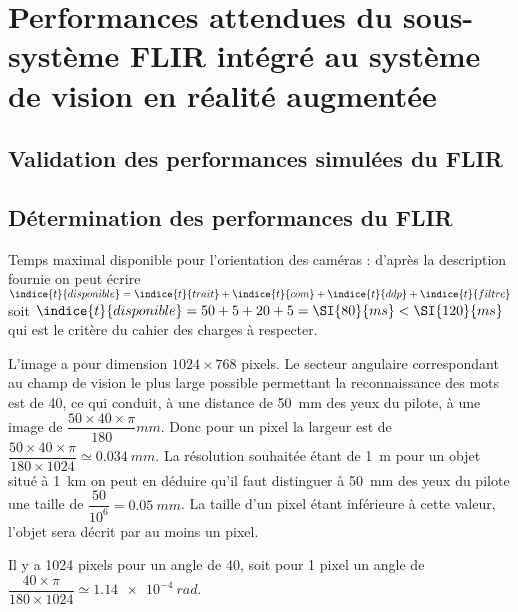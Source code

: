 
\section{Performances attendues du sous-système FLIR intégré au système
de vision en réalité augmentée}
\subsection{Validation des performances simulées du FLIR}
\subsection{Détermination des performances du FLIR}


\question{}
\ifprof
\begin{corrige}
Temps maximal disponible pour l'orientation des caméras : d'après la description fournie on peut écrire
$\indice{t}{disponible} = \indice{t}{trait}+ \indice{t}{com}+ \indice{t}{ddp}+ \indice{t}{filtre}$
 soit $\indice{t}{disponible} = 50+5+20+5=\SI{80}{ms}<\SI{120}{ms}$ 
 qui est le critère du cahier des charges à respecter.
\end{corrige}
\else
\fi

\question{}
\ifprof
\begin{corrige}
L'image a pour dimension $1024 \times 768$ pixels. Le secteur angulaire correspondant au champ de vision le plus large possible permettant la reconnaissance des mots est de 40\degres, ce qui conduit, à une distance de \SI{50}{mm} des yeux du pilote, à une image de
$\dfrac{50\times 40 \times \pi}{180} \si{mm}$. 
Donc pour un pixel la largeur est de  
$\dfrac{50\times 40 \times \pi}{180\times 1024}  \simeq \SI{0,034}{mm}$. 
La résolution souhaitée étant de \SI{1}{m} pour un objet situé à \SI{1}{km} on peut en déduire qu'il faut distinguer à \SI{50}{mm} des yeux du pilote une taille de
$\dfrac{50}{10^6}=\SI{0,05}{mm}$. La taille d'un pixel étant inférieure à cette valeur, l'objet sera décrit par au moins un pixel.
\end{corrige}
\else
\fi

\question{}
\ifprof
\begin{corrige}
Il y a 1024 pixels pour un angle de 40\degres, soit pour 1 pixel un angle de 
$\dfrac{40 \times \pi}{180\times 1024} \simeq \SI{1,14e-4}{rad}$. 
\end{corrige}
\else
\fi

